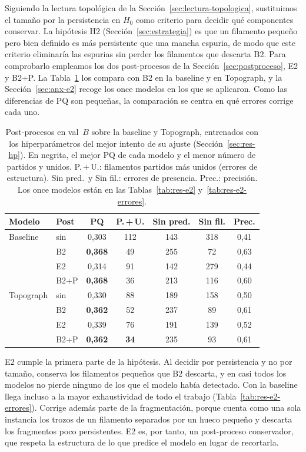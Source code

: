 Siguiendo la lectura topológica de la
Sección~\ref{sec:lectura-topologica}, sustituimos el tamaño por la
persistencia en $H_0$ como criterio para decidir qué componentes
conservar. La hipótesis H2 (Sección~\ref{sec:estrategia}) es que un
filamento pequeño pero bien definido es más persistente que una mancha
espuria, de modo que este criterio eliminaría las espurias sin perder
los filamentos que descarta B2. Para comprobarlo empleamos los dos
post-procesos de la Sección~\ref{sec:postproceso}, E2 y B2+P. La
Tabla~\ref{tab:res-e2-resumen} los compara con B2 en la baseline y en
Topograph, y la Sección~\ref{sec:anx-e2} recoge los once modelos en
los que se aplicaron. Como las diferencias de PQ son pequeñas, la
comparación se centra en qué errores corrige cada uno.

\begin{table}[ht]
\centering
\small
\begin{tabular}{@{}llccccc@{}}
\toprule
Modelo & Post & PQ & P.\,+\,U. & Sin pred. & Sin fil. & Prec.\\
\midrule
Baseline & sin  & 0,303 & 112 & 143 & 318 & 0,41\\
         & B2   & \textbf{0,368} & 49  & 255 & 72  & 0,63\\
         & E2   & 0,314 & 91  & 142 & 279 & 0,44\\
         & B2+P & \textbf{0,368} & 36  & 213 & 116 & 0,60\\
\midrule
Topograph & sin  & 0,330 & 88  & 189 & 158 & 0,50\\
          & B2   & \textbf{0,362} & 52  & 237 & 89  & 0,61\\
          & E2   & 0,339 & 76  & 191 & 139 & 0,52\\
          & B2+P & \textbf{0,362} & \textbf{34} & 235 & 93 & 0,61\\
\bottomrule
\end{tabular}
\caption{Post-procesos en val~$B$ sobre la baseline y Topograph,
entrenados con los hiperparámetros del mejor intento de su ajuste
(Sección~\ref{sec:res-hp}). En negrita, el mejor PQ
de cada modelo y el menor número de partidos y unidos. P.\,+\,U.: filamentos
partidos más unidos (errores de estructura). Sin pred.\ y Sin fil.:
errores de presencia. Prec.: precisión. Los once modelos están en las
Tablas~\ref{tab:res-e2} y~\ref{tab:res-e2-errores}.}
\label{tab:res-e2-resumen}
\end{table}

E2 cumple la primera parte de la hipótesis. Al decidir por persistencia
y no por tamaño, conserva los filamentos pequeños que B2 descarta, y en
casi todos los modelos no pierde ninguno de los que el modelo había
detectado. Con la baseline llega incluso a la mayor exhaustividad de
todo el trabajo (Tabla~\ref{tab:res-e2-errores}). Corrige además parte de
la fragmentación, porque cuenta como una sola instancia los trozos de un
filamento separados por un hueco pequeño y descarta los fragmentos poco
persistentes. E2 es, por tanto, un post-proceso conservador, que respeta
la estructura de lo que predice el modelo en lugar de recortarla.

